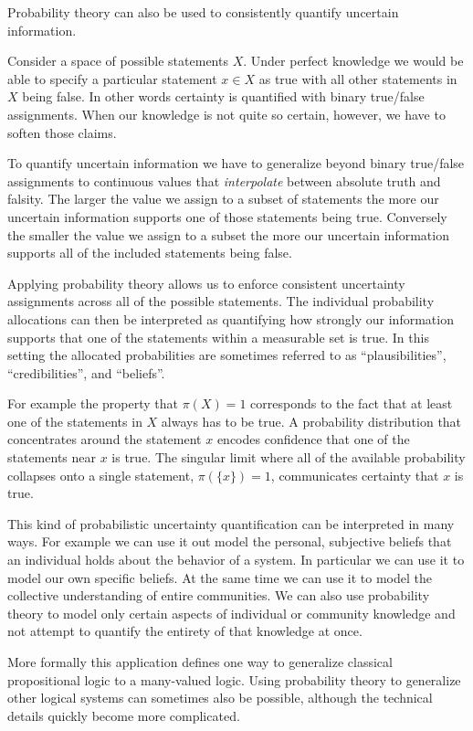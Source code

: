 \documentclass[
  letterpaper,
  DIV=11,
  numbers=noendperiod]{scrartcl}
\begin{document}
Probability theory can also be used to consistently quantify uncertain
information.

Consider a space of possible statements \(X\). Under perfect knowledge
we would be able to specify a particular statement \(x \in X\) as true
with all other statements in \(X\) being false. In other words certainty
is quantified with binary true/false assignments. When our knowledge is
not quite so certain, however, we have to soften those claims.

To quantify uncertain information we have to generalize beyond binary
true/false assignments to continuous values that \emph{interpolate}
between absolute truth and falsity. The larger the value we assign to a
subset of statements the more our uncertain information supports one of
those statements being true. Conversely the smaller the value we assign
to a subset the more our uncertain information supports all of the
included statements being false.

Applying probability theory allows us to enforce consistent uncertainty
assignments across all of the possible statements. The individual
probability allocations can then be interpreted as quantifying how
strongly our information supports that one of the statements within a
measurable set is true. In this setting the allocated probabilities are
sometimes referred to as ``plausibilities'', ``credibilities'', and
``beliefs''.

For example the property that \(\pi(X) = 1\) corresponds to the fact
that at least one of the statements in \(X\) always has to be true. A
probability distribution that concentrates around the statement \(x\)
encodes confidence that one of the statements near \(x\) is true. The
singular limit where all of the available probability collapses onto a
single statement, \(\pi( \{ x \} ) = 1\), communicates certainty that
\(x\) is true.

This kind of probabilistic uncertainty quantification can be interpreted
in many ways. For example we can use it out model the personal,
subjective beliefs that an individual holds about the behavior of a
system. In particular we can use it to model our own specific beliefs.
At the same time we can use it to model the collective understanding of
entire communities. We can also use probability theory to model only
certain aspects of individual or community knowledge and not attempt to
quantify the entirety of that knowledge at once.

More formally this application defines one way to generalize classical
propositional logic to a many-valued logic. Using probability theory to
generalize other logical systems can sometimes also be possible,
although the technical details quickly become more complicated.
\end{document}
